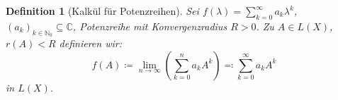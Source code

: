 \documentclass[12pt]{extreport} %
\newcommand{\C}{\mathbb{C}}
\newcommand{\N}{\mathbb{N}}
\theoremstyle{named}
\theoremstyle{nnamed}
\theoremstyle{itshape}
\newtheorem{definition}{Definition}  \counterwithin{definition}{chapter}
\theoremstyle{normal}
\begin{document}
\begin{definition}[Kalkül für Potenzreihen]
	Sei $f(\lambda) = \sum_{k=0}^{\infty} a_k \lambda^k$, $\left( a_k \right)_{k \in \N_0} \subseteq \C$, Potenzreihe mit Konvergenzradius $R > 0$. Zu $A \in L(X)$, $r(A) < R$ definieren wir:
	$$ f(A) \coloneqq \lim_{n \rightarrow \infty} \left( \sum_{k = 0}^{n} a_k A^k \right) \eqqcolon \sum_{k =0}^{\infty} a_k A^{k} $$
	in $L(X)$.
\end{definition}


\renewcommand{\indexname}{Stichwortverzeichnis}
\printindex
\end{document}

